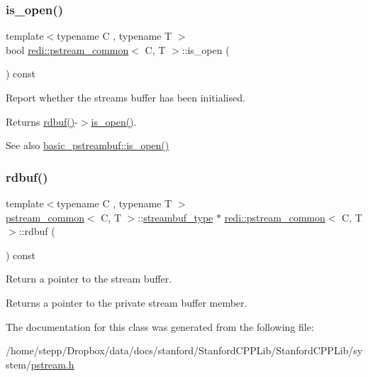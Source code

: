 \subsubsection{\texorpdfstring{is\+\_\+open()}{is\_open()}}
{\footnotesize\ttfamily template$<$typename C , typename T $>$ \\
bool \mbox{\hyperlink{classredi_1_1pstream__common}{redi\+::pstream\+\_\+common}}$<$ C, T $>$\+::is\+\_\+open (\begin{DoxyParamCaption}{ }\end{DoxyParamCaption}) const\hspace{0.3cm}{\ttfamily [inline]}}



Report whether the stream\textquotesingle{}s buffer has been initialised. 

\begin{DoxyReturn}{Returns}
\mbox{\hyperlink{classredi_1_1pstream__common_a5414d5a3f3d91a9483d5c9128434db26}{rdbuf()}}-\/$>$\mbox{\hyperlink{classredi_1_1pstream__common_a8d5ec13821e09f4bb2ab5096721551a5}{is\+\_\+open()}}. 
\end{DoxyReturn}
\begin{DoxySeeAlso}{See also}
\mbox{\hyperlink{classredi_1_1basic__pstreambuf_af28fab6dc978b25c92740400512a61bc}{basic\+\_\+pstreambuf\+::is\+\_\+open()}} 
\end{DoxySeeAlso}
\mbox{\label{classredi_1_1pstream__common_a5414d5a3f3d91a9483d5c9128434db26}} 
\subsubsection{\texorpdfstring{rdbuf()}{rdbuf()}}
{\footnotesize\ttfamily template$<$typename C , typename T $>$ \\
\mbox{\hyperlink{classredi_1_1pstream__common}{pstream\+\_\+common}}$<$ C, T $>$\+::\mbox{\hyperlink{classredi_1_1basic__pstreambuf}{streambuf\+\_\+type}} $\ast$ \mbox{\hyperlink{classredi_1_1pstream__common}{redi\+::pstream\+\_\+common}}$<$ C, T $>$\+::rdbuf (\begin{DoxyParamCaption}{ }\end{DoxyParamCaption}) const\hspace{0.3cm}{\ttfamily [inline]}}



Return a pointer to the stream buffer. 

\begin{DoxyReturn}{Returns}
a pointer to the private stream buffer member. 
\end{DoxyReturn}


The documentation for this class was generated from the following file\+:\begin{DoxyCompactItemize}
\item 
/home/stepp/\+Dropbox/data/docs/stanford/\+Stanford\+C\+P\+P\+Lib/\+Stanford\+C\+P\+P\+Lib/system/\mbox{\hyperlink{pstream_8h}{pstream.\+h}}\end{DoxyCompactItemize}
